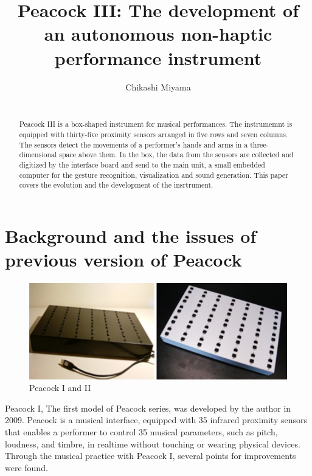 \documentclass{nime-alternate}
\begin{document}
\title{Peacock III: The development of an autonomous non-haptic performance instrument}
\author{
\alignauthor
Chikashi Miyama\\
       \\
}

\maketitle
\begin{abstract}
Peacock III is a box-shaped instrument for musical performances. The instrumemnt is equipped with thirty-five proximity sensors arranged in five rows and seven columns. The sensors detect the movements of a performer's hands and arms in a three-dimensional space above them. In the box, the data from the sensors are collected and digitized by the interface board and send to the main unit, a small embedded computer for the gesture recognition, visualization and sound generation. This paper covers the evolution and the development of the insrtrument.
\end{abstract}

\section{Background and the issues of previous version of Peacock}

\begin{figure}[htbp]
       \begin{center}
              \includegraphics[scale = 0.55]{peacocks.pdf}
       \end{center}
       \caption{Peacock I and II}
       \label{fig:old_peacock}
\end{figure}

Peacock I, The first model of Peacock series, was developed by the author in 2009\cite{miyama:peacock}. Peacock is a musical interface, equipped with 35 infrared proximity sensors that enables a performer to control 35 musical parameters, such as pitch, loudness, and timbre, in realtime without touching or wearing physical devices. Through the musical practice with  Peacock I, several points for improvements were found. 
\end{document}
